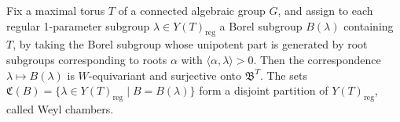 Fix a maximal torus $T$ of a connected algebraic group $G$, and assign to each regular 1-parameter subgroup $\lambda \in Y(T)_{\text{reg}}$ a Borel subgroup $B(\lambda)$ containing $T$, by taking the Borel subgroup whose unipotent part is generated by root subgroups corresponding to roots $\alpha$ with $\langle \alpha, \lambda \rangle > 0$. Then the correspondence $\lambda \mapsto B(\lambda)$ is $W$-equivariant and surjective onto $\mathfrak{B}^T$. The sets $\mathfrak{C}(B) = \{\lambda \in Y(T)_{\text{reg}} \mid B = B(\lambda)\}$ form a disjoint partition of $Y(T)_{\text{reg}}$, called Weyl chambers.
